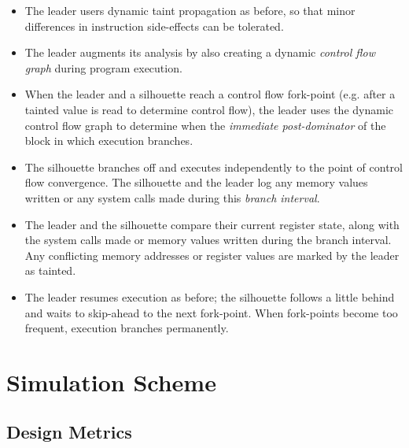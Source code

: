 \begin{itemize}

\item The leader users dynamic taint propagation as before,
  so that minor differences in instruction side-effects
  can be tolerated.

\item The leader augments its analysis by also
  creating a dynamic {\em control flow graph}
  during program execution.

\item When the leader and a silhouette reach a
  control flow fork-point (e.g. after a tainted value
  is read to determine control flow), the
  leader uses the dynamic control flow
  graph to determine when the {\em immediate post-dominator}
  of the block in which execution branches.

\item 
  The silhouette branches off 
  and executes independently to the 
  point of control flow convergence.
  The silhouette and the leader log
  any memory values written 
  or any system calls made
  during this {\em branch interval}.

\item 
  The leader and the silhouette
  compare their current register state, along with the system calls made
  or memory values written during the branch interval. 
  Any conflicting memory addresses 
  or register values are
  marked by the leader as tainted.

\item The leader resumes
  execution as before; the silhouette
  follows a little behind 
  and waits to skip-ahead to the next fork-point.
  When fork-points become too frequent,
  execution branches permanently.

\end{itemize}

\section{Simulation Scheme} \label{silsimulation}

\subsection{Design Metrics}

